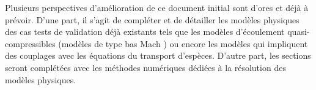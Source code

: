 \lhead{}
Plusieurs perspectives d'am\'elioration de ce document initial sont
d'ores et d\'ej\`a \`a pr\'evoir. D'une part, il s'agit de compl\'eter et de
d\'etailler les mod\`eles physiques des cas tests de validation d\'ej\`a existants
tels que les mod\`eles d'\'ecoulement quasi-compressibles (mod\`eles de
type \og bas Mach \fg{}) ou encore les mod\`eles qui impliquent des
couplages avec les \'equations du transport d'esp\`eces. D'autre part,
les sections seront compl\'et\'ees avec les m\'ethodes num\'eriques d\'edi\'ees
\`a la r\'esolution des mod\`eles physiques.
